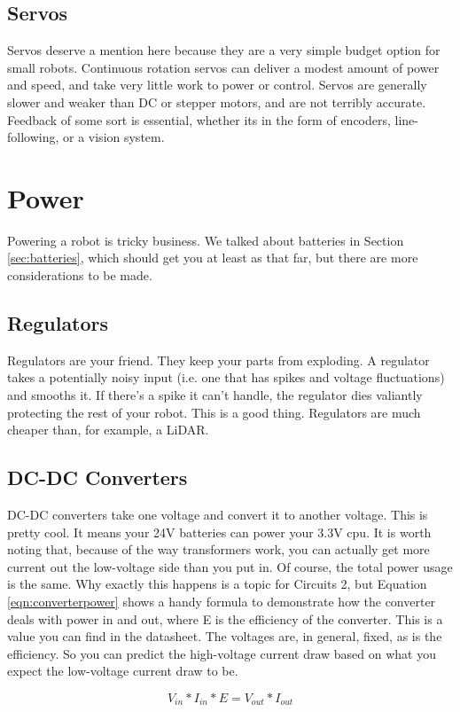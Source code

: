 \subsection{Servos}

Servos deserve a mention here because they are a very simple budget option for small robots. Continuous rotation servos can deliver a modest amount of power and speed, and take very little work to power or control. Servos are generally slower and weaker than DC or stepper motors, and are not terribly accurate. Feedback of some sort is essential, whether its in the form of encoders, line-following, or a vision system.

\section{Power}

Powering a robot is tricky business. We talked about batteries in Section \ref{sec:batteries}, which should get you at least as that far, but there are more considerations to be made.

\subsection{Regulators}
\label{sec:regulators}

Regulators are your friend. They keep your parts from exploding. A regulator takes a potentially noisy input (i.e. one that has spikes and voltage fluctuations) and smooths it. If there's a spike it can't handle, the regulator dies valiantly protecting the rest of your robot. This is a good thing. Regulators are much cheaper than, for example, a LiDAR.

\subsection{DC-DC Converters}

DC-DC converters take one voltage and convert it to another voltage. This is pretty cool. It means your 24V batteries can power your 3.3V cpu. It is worth noting that, because of the way transformers work, you can actually get more current out the low-voltage side than you put in. Of course, the total power usage is the same. Why exactly this happens is a topic for Circuits 2, but Equation \ref{eqn:converterpower} shows a handy formula to demonstrate how the converter deals with power in and out, where E is the efficiency of the converter. This is a value you can find in the datasheet. The voltages are, in general, fixed, as is the efficiency. So you can predict the high-voltage current draw based on what you expect the low-voltage current draw to be.

\begin{equation}
V_{in}*I_{in}*E=V_{out}*I_{out}
\label{eqn:converterpower}
\end{equation}

\subsection{}